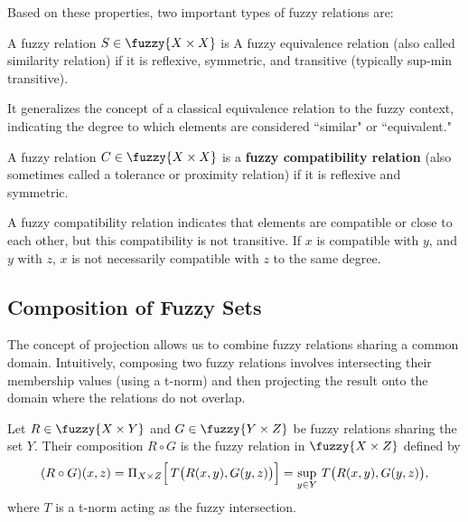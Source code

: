 Based on these properties, two important types of fuzzy relations are:

\begin{definition}
  A fuzzy relation $S \in \fuzzy{X \times X}$ is A fuzzy equivalence relation (also called similarity relation) if it is reflexive, symmetric, and transitive (typically sup-min transitive).
\end{definition}
It generalizes the concept of a classical equivalence relation to the fuzzy context, indicating the degree to which elements are considered ``similar" or ``equivalent."

\begin{definition}
  A fuzzy relation $C \in \fuzzy{X \times X}$ is a \textbf{fuzzy compatibility relation} (also sometimes called a tolerance or proximity relation) if it is reflexive and symmetric.
\end{definition}
A fuzzy compatibility relation indicates that elements are compatible or close to each other, but this compatibility is not transitive. If $x$ is compatible with $y$, and $y$ with $z$, $x$ is not necessarily compatible with $z$ to the same degree.










\subsection{Composition of Fuzzy Sets}
\label{sec:compos}

The concept of projection allows us to combine fuzzy relations sharing a common domain. Intuitively, composing two fuzzy relations involves intersecting their membership values (using a t-norm) and then projecting the result onto the domain where the relations do not overlap.

\begin{definition}\label{def:compos}
    Let \( R \in \fuzzy{X \times Y} \) and \( G \in \fuzzy{Y \times Z} \) be fuzzy relations sharing the set \(Y\). Their composition \( R \circ G \) is the fuzzy relation in \(\fuzzy{X \times Z}\) defined by
    \[
    (R \circ G)(x,z) = \Pi_{X\times Z}\Bigl[\, T\bigl(R(x,y), G(y,z)\bigr) \Bigr] = \sup_{y\in Y}\, T\bigl(R(x,y), G(y,z)\bigr),
    \]
    where \(T\) is a t-norm acting as the fuzzy intersection.
\end{definition}


